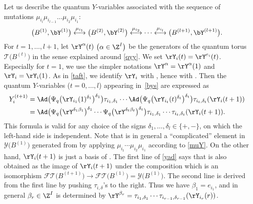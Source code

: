 Let us describe the quantum $Y$-variables associated with the sequence
of mutations $\mu_{i_l} \mu_{i_{l-1}} \dots \allowbreak\mu_{i_2} \mu_{i_1}$:
 \begin{align}\label{bys}
\bigl(B^{(1)},\bY^{(1)}\bigr) \stackrel{\mu_{i_1}}{\longleftrightarrow}
\bigl(B^{(2)},\bY^{(2)}\bigr) \stackrel{\mu_{i_2}}{\longleftrightarrow}
\cdots
\stackrel{\mu_{i_l}}{\longleftrightarrow} \bigl(B^{(l+1)},\bY^{(l+1)}\bigr).
\end{align}
%
For $t=1, \dots, l+1$, let $\rY^\alpha(t)$ $\bigl(\alpha \in \Z^I\bigr)$ be the
generators of the quantum torus $\mathcal{T}\bigl(B^{(t)}\bigr)$ in the sense
explained around \eqref{qyy}. We set $\rY_i(t) =
\rY^{e_i}(t)$.
Especially for $t=1$, we use the simpler notations
$\rY^\alpha=\rY^\alpha(1)$ and $\rY_i=\rY_i(1)$. As in \eqref{taft},
we identify $\rY_i$ with , hence
 with .
%
Then the quantum $Y$-variables 
($t=0, \dots, l$) appearing in~\eqref{bys} are expressed as
\begin{align}
Y_i^{(t+1)}
&= \Ad\bigl(\Psi_{q}\bigl(\rY_{i_1}(1)^{\delta_1}\bigr)^{\delta_1}\bigr) \tau_{i_1,\delta_1}\dotsm \Ad\bigl(\Psi_{q}\bigl(\rY_{i_{t}}(t)^{\delta_{t}}\bigr)^{\delta_{t}}\bigr) \tau_{i_{t},\delta_{t}}(\rY_i(t+1))\nonumber
\\
&=\Ad\bigl(\Psi_{q}\bigl(\rY^{\delta_1 \beta_1}\bigr)^{\delta_1} \dotsm \Psi_{q}\bigl(\rY^{\delta_{t} \beta_{t}}\bigr)^{\delta_{t}}\bigr) \tau_{i_1,\delta_1}\dotsm \tau_{i_{t},\delta_{t}}(\rY_i(t+1)).\label{yad}
\end{align}
This formula is valid for any choice of the signs $\delta_1, \dots,
\delta_l \in \{+, -\}$, on which the left-hand side is independent. Note that
 is in general a ``complicated'' element in
$\mathcal{Y}\bigl(B^{(1)}\bigr)$ generated from  by applying
$\mu_{i_t}\dotsm \mu_{i_2}\mu_{i_1}$ according to \eqref{muY}.
On the other hand,
$\rY_i(t+1)$ is just a basis of . The first
line of \eqref{yad} says that  is also obtained as the
image of $\rY_i(t+1)$ under the composition
 which is an
isomorphism
$\mathcal{FT}\bigl(B^{(t+1)}\bigr) \rightarrow \mathcal{FT}\bigl(B^{(1)}\bigr) =
\mathcal{Y}\bigl(B^{(1)}\bigr)$. The second line is derived from the first line
by pushing $\tau_{i,\delta}$'s to the right. Thus we have $\beta_1 = e_{i_1}$,
and in general $\beta_r \in \Z^I$ is determined by
$\rY^{\beta_r} = \tau_{i_1,\delta_1} \dotsm \tau_{i_{r-1},
 \delta_{r-1}}(\rY_{i_r}(r))$.



